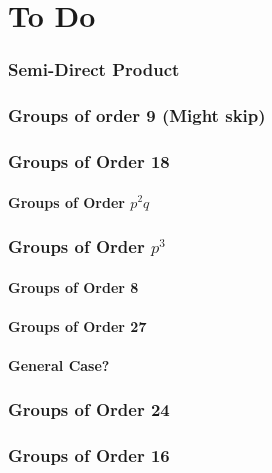 \documentclass[a4paper, oneside, 12pt, final]{article}
\newtheorem{theorem}{Theorem}[section]
\theoremstyle{definition}
\newtheorem{definition}[theorem]{Definition}
\DeclareMathOperator{\Aut}{Aut}
\begin{document}

\part{To Do}

\section{Semi-Direct Product}
%
%
%
%

\section{Groups of order 9 (Might skip)}



\section{Groups of Order 18}
\subsection{Groups of Order \(p^2q\)}

\section{Groups of Order \(p^3\)}
\subsection{Groups of Order 8}
\subsection{Groups of Order 27}
\subsection{General Case?}

\section{Groups of Order 24}

\section{Groups of Order 16}
\end{document}
